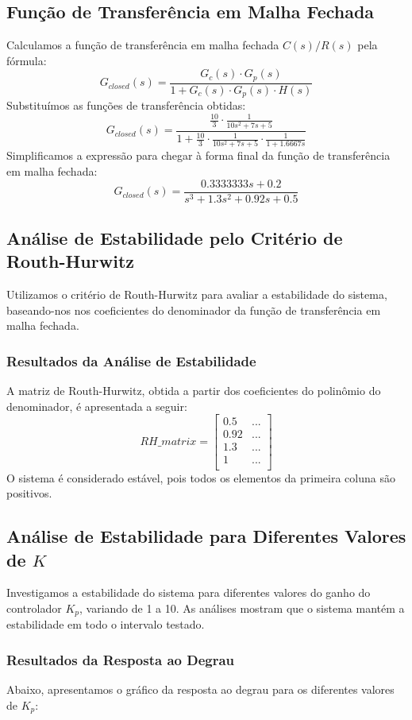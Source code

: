 \subsection{Função de Transferência em Malha Fechada}
Calculamos a função de transferência em malha fechada \( C(s)/R(s) \) pela fórmula:
\[
    G_{closed}(s) = \frac{G_c(s) \cdot G_p(s)}{1 + G_c(s) \cdot G_p(s) \cdot H(s)}
\]
Substituímos as funções de transferência obtidas:
\[
    G_{closed}(s) = \frac{\frac{10}{3} \cdot \frac{1}{10 s^2 + 7 s + 5}}{1 + \frac{10}{3} \cdot \frac{1}{10 s^2 + 7 s + 5} \cdot \frac{1}{1 + 1.6667 s}}
\]
Simplificamos a expressão para chegar à forma final da função de transferência em malha fechada:
\[
    G_{closed}(s) = \frac{0.3333333s + 0.2}{s^3 + 1.3s^2 + 0.92s + 0.5}
\]

\subsection{Análise de Estabilidade pelo Critério de Routh-Hurwitz}
Utilizamos o critério de Routh-Hurwitz para avaliar a estabilidade do sistema, baseando-nos nos coeficientes do denominador da função de transferência em malha fechada.

\subsubsection{Resultados da Análise de Estabilidade}
A matriz de Routh-Hurwitz, obtida a partir dos coeficientes do polinômio do denominador, é apresentada a seguir:
\[
    RH\_matrix = \begin{bmatrix}
        0.5  & ... \\
        0.92 & ... \\
        1.3  & ... \\
        1    & ... \\
    \end{bmatrix}
\]
O sistema é considerado estável, pois todos os elementos da primeira coluna são positivos.

\subsection{Análise de Estabilidade para Diferentes Valores de \( K \)}
Investigamos a estabilidade do sistema para diferentes valores do ganho do controlador \( K_p \), variando de 1 a 10. As análises mostram que o sistema mantém a estabilidade em todo o intervalo testado.

\subsubsection{Resultados da Resposta ao Degrau}
Abaixo, apresentamos o gráfico da resposta ao degrau para os diferentes valores de \( K_p \):

